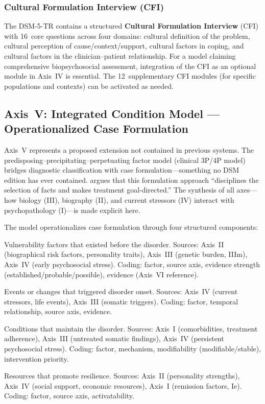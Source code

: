 \documentclass[11pt,a4paper]{article}
\begin{document}
\subsubsection{Cultural Formulation Interview (CFI)}

The DSM-5-TR contains a structured \textbf{Cultural Formulation Interview} (CFI) with 16~core questions across four domains: cultural definition of the problem, cultural perception of cause/context/support, cultural factors in coping, and cultural factors in the clinician--patient relationship. For a model claiming comprehensive biopsychosocial assessment, integration of the CFI as an optional module in Axis~IV is essential. The 12~supplementary CFI modules (for specific populations and contexts) can be activated as needed.

\subsection{Axis~V: Integrated Condition Model --- Operationalized Case Formulation}
\label{sec:axis5}

Axis~V represents a proposed extension not contained in previous systems. The predisposing--precipitating--perpetuating factor model (clinical 3P/4P model) bridges diagnostic classification with case formulation---something no DSM edition has ever contained. \citet{Owen2023} argues that this formulation approach ``disciplines the selection of facts and makes treatment goal-directed.'' The synthesis of all axes---how biology (III), biography (II), and current stressors (IV) interact with psychopathology (I)---is made explicit here.

The model operationalizes case formulation through four structured components:

\begin{description}[style=nextline, leftmargin=1.5cm, font=\bfseries]
\item[Predisposing Factors (P1)] Vulnerability factors that existed before the disorder. Sources: Axis~II (biographical risk factors, personality traits), Axis~III (genetic burden, IIIm), Axis~IV (early psychosocial stress). Coding: factor, source axis, evidence strength (established/probable/possible), evidence (Axis~VI reference).
\item[Precipitating Factors (P2)] Events or changes that triggered disorder onset. Sources: Axis~IV (current stressors, life events), Axis~III (somatic triggers). Coding: factor, temporal relationship, source axis, evidence.
\item[Perpetuating Factors (P3)] Conditions that maintain the disorder. Sources: Axis~I (comorbidities, treatment adherence), Axis~III (untreated somatic findings), Axis~IV (persistent psychosocial stress). Coding: factor, mechanism, modifiability (modifiable/stable), intervention priority.
\item[Protective Factors (P4)] Resources that promote resilience. Sources: Axis~II (personality strengths), Axis~IV (social support, economic resources), Axis~I (remission factors, Ie). Coding: factor, source axis, activatability.
\end{description}
\end{document}
